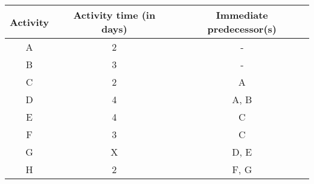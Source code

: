 \begin{center}
\begin{tabular}{|c|c|c|}
\hline
\textbf{Activity} & \textbf{Activity time (in days)} & \textbf{Immediate predecessor(s)} \\
\hline
A & 2 & - \\
B & 3 & - \\
C & 2 & A \\
D & 4 & A, B \\
E & 4 & C \\
F & 3 & C \\
G & X & D, E \\
H & 2 & F, G \\
\hline
\end{tabular}
\end{center}
